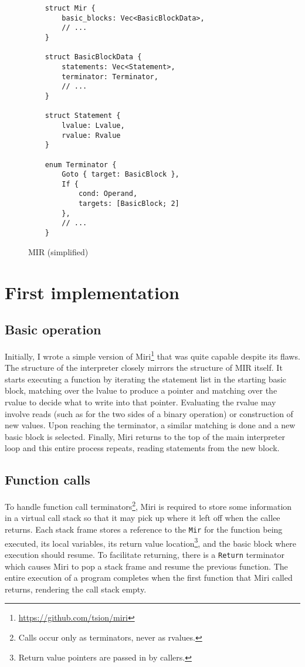 \documentclass[twocolumn]{article}
\newcommand{\rust}[1]{\texttt{#1}}
\begin{document}
\begin{figure}[ht]
  \begin{verbatim}
    struct Mir {
        basic_blocks: Vec<BasicBlockData>,
        // ...
    }

    struct BasicBlockData {
        statements: Vec<Statement>,
        terminator: Terminator,
        // ...
    }

    struct Statement {
        lvalue: Lvalue,
        rvalue: Rvalue
    }

    enum Terminator {
        Goto { target: BasicBlock },
        If {
            cond: Operand,
            targets: [BasicBlock; 2]
        },
        // ...
    }
  \end{verbatim}
  \caption{MIR (simplified)}
  \label{fig:mir}
\end{figure}


\section{First implementation}

\subsection{Basic operation}

Initially, I wrote a simple version of Miri\footnote{\url{https://github.com/tsion/miri}} that was
quite capable despite its flaws. The structure of the interpreter closely mirrors the structure of
MIR itself. It starts executing a function by iterating the statement list in the starting basic
block, matching over the lvalue to produce a pointer and matching over the rvalue to decide what to
write into that pointer. Evaluating the rvalue may involve reads (such as for the two sides of a
binary operation) or construction of new values. Upon reaching the terminator, a similar matching is
done and a new basic block is selected. Finally, Miri returns to the top of the main interpreter
loop and this entire process repeats, reading statements from the new block.

\subsection{Function calls}

To handle function call terminators\footnote{Calls occur only as terminators, never as rvalues.},
Miri is required to store some information in a virtual call stack so that it may pick up where it
left off when the callee returns. Each stack frame stores a reference to the \rust{Mir} for the
function being executed, its local variables, its return value location\footnote{Return value
pointers are passed in by callers.}, and the basic block where execution should resume. To
facilitate returning, there is a \rust{Return} terminator which causes Miri to pop a stack frame and
resume the previous function. The entire execution of a program completes when the first function
that Miri called returns, rendering the call stack empty.
\end{document}
